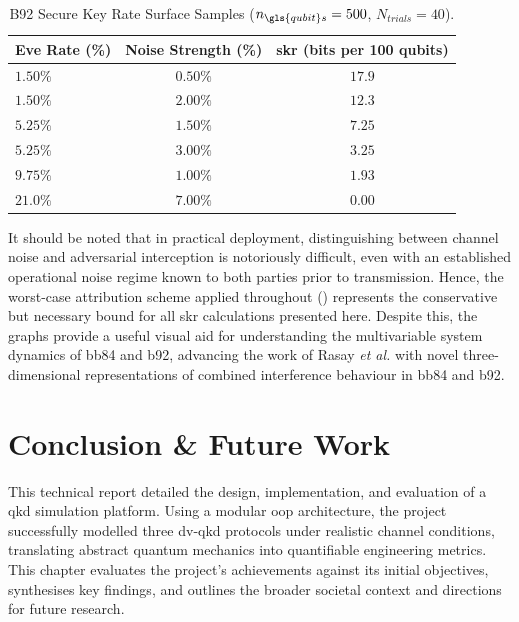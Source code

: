 \documentclass[11pt, a4paper]{report}
\renewcommand{\footnotesize}{\fontsize{9}{10}\selectfont}
\begin{document}
\begin{table}[htbp]
    \centering
    \caption{B92 Secure Key Rate Surface Samples ($n_{\gls{qubit}s}=500$, $N_{trials}=40$).}
    \label{tab:b92SKRsurface}
    \footnotesize
    \begin{tabular}{@{}l c c@{}}
        \toprule
        \textbf{Eve Rate (\%)} & \textbf{Noise Strength (\%)} & \textbf{\gls{skr} (bits per 100 \glspl{qubit})}\\
        \midrule
        $1.50\%$ & $0.50\%$ & \textbf{$17.9$} \\
        $1.50\%$ & $2.00\%$ & \textbf{$12.3$} \\
        $5.25\%$ & $1.50\%$ & \textbf{$7.25$} \\
        $5.25\%$ & $3.00\%$ & \textbf{$3.25$} \\
        $9.75\%$ & $1.00\%$ & \textbf{$1.93$} \\
        $21.0\%$ & $7.00\%$ & \textbf{$0.00$} \\
        \bottomrule
    \end{tabular}
\end{table}

It should be noted that in practical deployment, distinguishing between channel noise and adversarial interception is notoriously difficult, even with an established operational noise regime known to both parties prior to transmission. Hence, the worst-case attribution scheme applied throughout () represents the conservative but necessary bound for all \gls{skr} calculations presented here. Despite this, the graphs provide a useful visual aid for understanding the multivariable system dynamics of \gls{bb84} and \gls{b92}, advancing the work of Rasay \textit{et al.} \cite{rasay2026} with novel three-dimensional representations of combined interference behaviour in \gls{bb84} and \gls{b92}.


\chapter{Conclusion \& Future Work}

This technical report detailed the design, implementation, and evaluation of a \gls{qkd} simulation platform. Using a modular \gls{oop} architecture, the project successfully modelled three \gls{dv}-\gls{qkd} protocols under realistic channel conditions, translating abstract quantum mechanics into quantifiable engineering metrics. This chapter evaluates the project's achievements against its initial objectives, synthesises key findings, and outlines the broader societal context and directions for future research.
\end{document}
